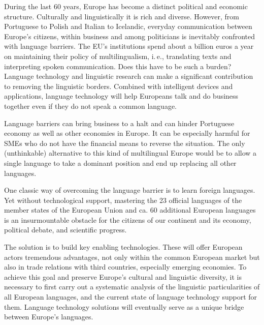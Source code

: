 \begin{multicols}{2}

During the last 60 years, Europe has become a distinct political and economic structure. Culturally and linguistically it is rich and diverse. However, from Portuguese to Polish and Italian to Icelandic, everyday communication between Europe’s citizens, within business and among politicians is inevitably confronted with language barriers. The EU's institutions spend about a billion euros a year on maintaining their policy of multilingualism, i.\,e., translating texts and interpreting spoken communication. Does this have to be such a burden? Language technology and linguistic research can make a significant contribution to removing the linguistic borders. Combined with intelligent devices and applications, language technology will help Europeans talk and do business together even if they do not speak a common language. 


Language barriers can bring business to a halt and can hinder Portuguese economy as well as other economies in Europe. It can be especially harmful for SMEs who do not have the financial means to reverse the situation. The only (unthinkable) alternative to this kind of multilingual Europe would be to allow a single language to take a dominant position and end up replacing all other languages. 

    One classic way of overcoming the language barrier is to learn foreign languages. Yet without technological support, mastering the 23 official languages of the member states of the European Union and ca. 60 additional European languages is an insurmountable obstacle for the citizens of our continent and its economy, political debate, and scientific progress.  

   The solution is to build key enabling technologies. These will offer European actors tremendous advantages, not only within the common European market but also in trade relations with third countries, especially emerging economies.  To achieve this goal and preserve Europe’s cultural and linguistic diversity, it is necessary to first carry out a systematic analysis of the linguistic particularities of all European languages, and the current state of language technology support for them. Language technology solutions will eventually serve as a unique bridge between Europe’s languages. 



\end{multicols}
